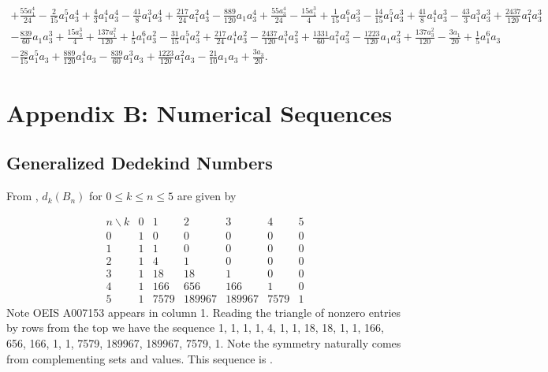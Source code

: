 \documentclass[12pt]{amsart}
\numberwithin{equation}{section}
\theoremstyle{definition}
\begin{document}
\begin{multline*}
   \scriptstyle
   +\frac{55 a_{1}^4}{24}-\frac{2}{15} a_{1}^5 a_{3}^4+\frac{4}{3} a_{1}^4 a_{3}^4-\frac{41}{8} a_{1}^3 a_{3}^4+\frac{217}{24} a_{1}^2 a_{3}^4 -\frac{889}{120} a_{1} a_{3}^4+\frac{55 a_{3}^4}{24}-\frac{15 a_{1}^3}{4}+\frac{1}{15} a_{1}^6 a_{3}^3-\frac{14}{15} a_{1}^5 a_{3}^3+\frac{41}{8} a_{1}^4 a_{3}^3-\frac{43}{3} a_{1}^3 a_{3}^3+\frac{2437}{120} a_{1}^2 a_{3}^3\\
   \scriptstyle
   -\frac{839}{60} a_{1} a_{3}^3 +\frac{15 a_{3}^3}{4}+\frac{137 a_{1}^2}{120}+\frac{1}{5} a_{1}^6 a_{3}^2-\frac{31}{15} a_{1}^5 a_{3}^2+\frac{217}{24} a_{1}^4 a_{3}^2-\frac{2437}{120} a_{1}^3 a_{3}^2+\frac{1331}{60} a_{1}^2 a_{3}^2-\frac{1223}{120} a_{1} a_{3}^2+\frac{137 a_{3}^2}{120} -\frac{3 a_{1}}{20}+\frac{1}{5} a_{1}^6 a_{3}\\
   \scriptstyle -\frac{28}{15} a_{1}^5 a_{3}+\frac{889}{120} a_{1}^4 a_{3}-\frac{839}{60} a_{1}^3 a_{3}+\frac{1223}{120} a_{1}^2 a_{3}-\frac{21}{10} a_{1} a_{3}+\frac{3 a_{3}}{20}.
 \end{multline*}




\section*{Appendix B: Numerical Sequences}\label{sec:oeis}


\subsection{Generalized Dedekind Numbers}

From , $d_{k}(B_{n})$ for $0\leq k\leq n\leq 5$ are
given by

$$\begin{array}{c|cccccc}
   n \backslash k & 0 & 1 & 2 & 3 & 4 & 5  \\ \hline
   0 & 1 & 0 & 0 & 0 & 0 & 0 \\
   1 & 1 & 1 & 0 & 0 & 0 & 0 \\
   2 & 1 & 4 & 1 & 0 & 0 & 0 \\
   3 & 1 & 18 & 18 & 1 & 0 & 0 \\
   4 & 1 & 166 & 656 & 166 & 1 & 0 \\
   5 & 1 & 7579 & 189967 & 189967 & 7579 & 1 \end{array}
$$
Note OEIS A007153 appears in column 1.  Reading the triangle of
nonzero entries by rows from the top we have the sequence 1, 1, 1, 1, 4,
1, 1, 18, 18, 1, 1, 166, 656, 166, 1, 1, 7579, 189967, 189967, 7579, 1.
Note the symmetry naturally comes from complementing sets and values.
This sequence is \cite[A374819]{oeis}.
\end{document}
